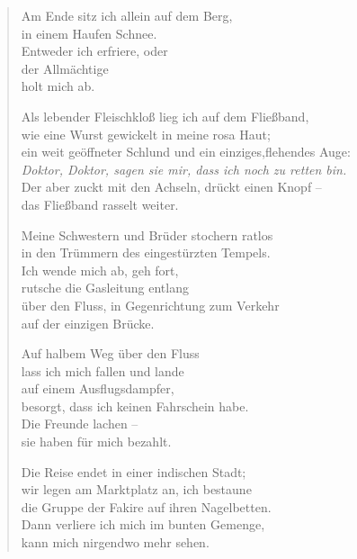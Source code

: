 
\cleartoverso

{\setlength{\stanzaskip}{0.6em}


\begin{verse}
Am Ende sitz ich allein auf dem Berg,\\
in einem Haufen Schnee.\\
Entweder ich erfriere, oder\\
der Allmächtige\\
holt mich ab.

\rhytmbreak

Als lebender Fleischkloß lieg ich auf dem Fließband,\\
wie eine Wurst gewickelt in meine rosa Haut;\\
ein weit geöffneter Schlund und ein einziges,\verselinebreak flehendes Auge:\\
\emph{Doktor, Doktor, sagen sie mir, dass ich noch zu retten bin.}\\
Der aber zuckt mit den Achseln, drückt einen Knopf --\\
das Fließband rasselt weiter.

\rhytmbreak

Meine Schwestern und Brüder stochern ratlos\\
in den Trümmern des eingestürzten Tempels.\\
Ich wende mich ab, geh fort,\\
rutsche die Gasleitung entlang\\
über den Fluss, in Gegenrichtung zum Verkehr\\
auf der einzigen Brücke.

\rhytmbreak

\clearpage

Auf halbem Weg über den Fluss\\
lass ich mich fallen und lande\\
auf einem Ausflugsdampfer,\\
besorgt, dass ich keinen Fahrschein habe.\\
Die Freunde lachen --\\
sie haben für mich bezahlt.

\rhytmbreak

Die Reise endet in einer indischen Stadt;\\
wir legen am Marktplatz an, ich bestaune\\
die Gruppe der Fakire auf ihren Nagelbetten.\\
Dann verliere ich mich im bunten Gemenge,\\
kann mich nirgendwo mehr sehen.


\end{verse}}
